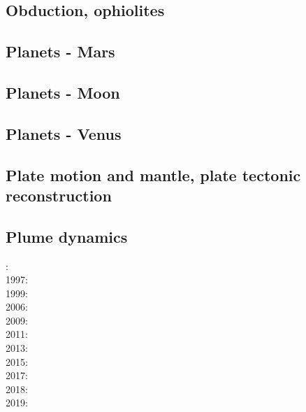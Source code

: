\subsection*{Obduction, ophiolites}

\noindent
\cite{hack90}
\cite{hack91}
\cite{agzf14}

\subsection*{Planets - Mars}

\cite{scbg90}
\cite{nist01}
\cite{vavv05}
\cite{seki14}
\cite{zhon16}

\subsection*{Planets - Moon}

\cite{zhdv19}

\subsection*{Planets - Venus}

\cite{scbg90}
\cite{kiha92}
\cite{somo96}
\cite{mazk98}\cite{moso98}
\cite{vavv05}
\cite{arta12}
\cite{cram17}\cite{dast17}
\cite{king18}



\subsection*{Plate motion and mantle, plate tectonic reconstruction}

\noindent
\cite{mcse73}
\cite{zieg92a}
\cite{zhgm98}
\cite{evan03}
\cite{lizh09}\cite{vasv09}
\cite{huss12}\cite{gutz12}
\cite{mosq13}
\cite{yoha15}
\cite{tewg19}

\subsection*{Plume dynamics}

: \cite{nasf94}\cite{hayu94}\\
1997: \cite{vank97}\\
1999: \cite{lays99}\\
2006: \cite{isst06}\cite{liva06a}\cite{liva06b}\cite{zhon06}\\
2009: \cite{vavl09}\\
2011: \cite{toyu11}\cite{talz11}\cite{burk11}\cite{memm11}\cite{dalt11}\\
2013: \cite{dagm13}\cite{madd13}\cite{ande13}\\
2015: \cite{daso15}\cite{hafg15}\\
2017: \cite{zhli17}\\
2018: \cite{dacc18}\\
2019: \cite{argc19}

